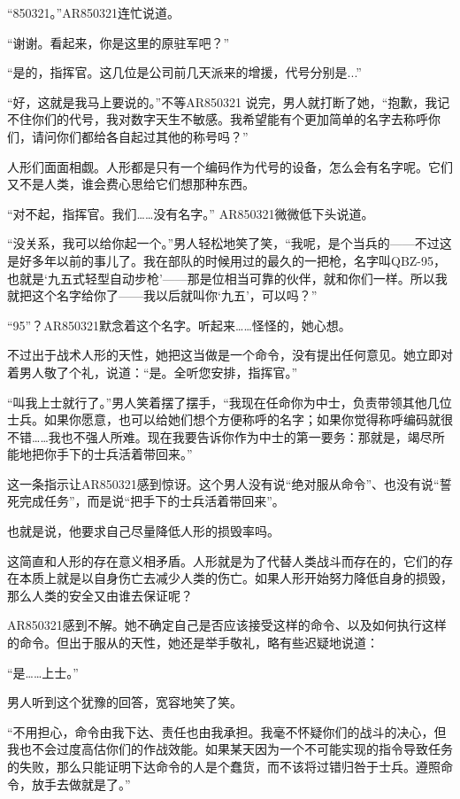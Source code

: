 “850321。”AR850321连忙说道。

“谢谢。看起来，你是这里的原驻军吧？”

“是的，指挥官。这几位是公司前几天派来的增援，代号分别是...”

“好，这就是我马上要说的。”不等AR850321 说完，男人就打断了她，“抱歉，我记不住你们的代号，我对数字天生不敏感。我希望能有个更加简单的名字去称呼你们，请问你们都给各自起过其他的称号吗？”

人形们面面相觑。人形都是只有一个编码作为代号的设备，怎么会有名字呢。它们又不是人类，谁会费心思给它们想那种东西。

“对不起，指挥官。我们……没有名字。” AR850321微微低下头说道。

“没关系，我可以给你起一个。”男人轻松地笑了笑，“我呢，是个当兵的——不过这是好多年以前的事儿了。我在部队的时候用过的最久的一把枪，名字叫QBZ-95，也就是‘九五式轻型自动步枪’——那是位相当可靠的伙伴，就和你们一样。所以我就把这个名字给你了——我以后就叫你‘九五’，可以吗？”

“95”？AR850321默念着这个名字。听起来……怪怪的，她心想。

不过出于战术人形的天性，她把这当做是一个命令，没有提出任何意见。她立即对着男人敬了个礼，说道：“是。全听您安排，指挥官。”

“叫我上士就行了。”男人笑着摆了摆手，“我现在任命你为中士，负责带领其他几位士兵。如果你愿意，也可以给她们想个方便称呼的名字；如果你觉得称呼编码就很不错……我也不强人所难。现在我要告诉你作为中士的第一要务：那就是，竭尽所能地把你手下的士兵活着带回来。”

这一条指示让AR850321感到惊讶。这个男人没有说“绝对服从命令”、也没有说“誓死完成任务”，而是说“把手下的士兵活着带回来”。

也就是说，他要求自己尽量降低人形的损毁率吗。

这简直和人形的存在意义相矛盾。人形就是为了代替人类战斗而存在的，它们的存在本质上就是以自身伤亡去减少人类的伤亡。如果人形开始努力降低自身的损毁，那么人类的安全又由谁去保证呢？

AR850321感到不解。她不确定自己是否应该接受这样的命令、以及如何执行这样的命令。但出于服从的天性，她还是举手敬礼，略有些迟疑地说道：

“是……上士。”

男人听到这个犹豫的回答，宽容地笑了笑。

“不用担心，命令由我下达、责任也由我承担。我毫不怀疑你们的战斗的决心，但我也不会过度高估你们的作战效能。如果某天因为一个不可能实现的指令导致任务的失败，那么只能证明下达命令的人是个蠢货，而不该将过错归咎于士兵。遵照命令，放手去做就是了。”

